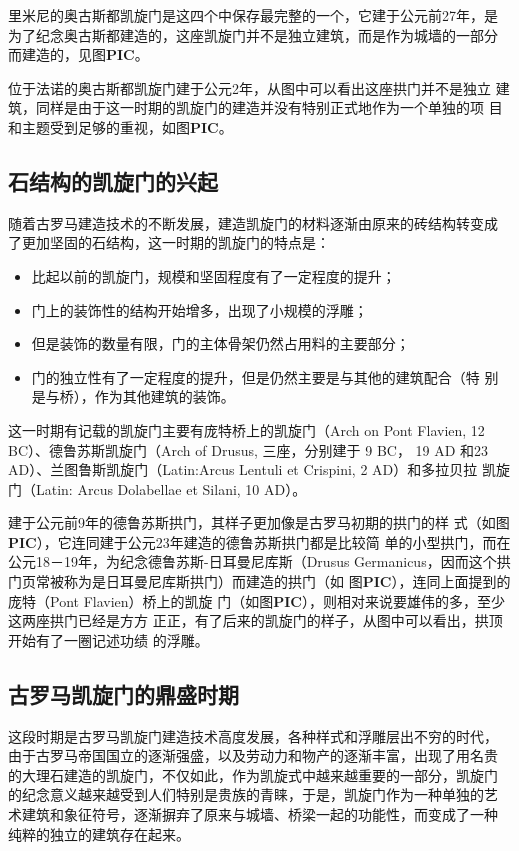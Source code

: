 \documentclass[a4paper,dvipdfm]{article}
\begin{document}
里米尼的奥古斯都凯旋门是这四个中保存最完整的一个，它建于公元前27年，是
为了纪念奥古斯都建造的，这座凯旋门并不是独立建筑，而是作为城墙的一部分
而建造的，见图\textbf{PIC}。

位于法诺的奥古斯都凯旋门建于公元2年，从图中可以看出这座拱门并不是独立
建筑，同样是由于这一时期的凯旋门的建造并没有特别正式地作为一个单独的项
目和主题受到足够的重视，如图\textbf{PIC}。


\subsection{石结构的凯旋门的兴起}

随着古罗马建造技术的不断发展，建造凯旋门的材料逐渐由原来的砖结构转变成
了更加坚固的石结构，这一时期的凯旋门的特点是：

\begin{itemize}
\item 比起以前的凯旋门，规模和坚固程度有了一定程度的提升；
\item 门上的装饰性的结构开始增多，出现了小规模的浮雕；
\item 但是装饰的数量有限，门的主体骨架仍然占用料的主要部分；
\item 门的独立性有了一定程度的提升，但是仍然主要是与其他的建筑配合（特
  别是与桥），作为其他建筑的装饰。
\end{itemize}

这一时期有记载的凯旋门主要有庞特桥上的凯旋门（Arch on Pont Flavien, 12
BC）、德鲁苏斯凯旋门（Arch of Drusus, 三座，分别建于 9 BC， 19 AD 和23
AD）、兰图鲁斯凯旋门（Latin:Arcus Lentuli et Crispini, 2 AD）和多拉贝拉
凯旋门（Latin: Arcus Dolabellae et Silani, 10 AD）。

建于公元前9年的德鲁苏斯拱门，其样子更加像是古罗马初期的拱门的样
式（如图\textbf{PIC}），它连同建于公元23年建造的德鲁苏斯拱门都是比较简
单的小型拱门，而在公元18－19年，为纪念德鲁苏斯-日耳曼尼库斯（Drusus
Germanicus，因而这个拱门页常被称为是日耳曼尼库斯拱门）而建造的拱门（如
图\textbf{PIC}），连同上面提到的庞特（Pont Flavien）桥上的凯旋
门（如图\textbf{PIC}），则相对来说要雄伟的多，至少这两座拱门已经是方方
正正，有了后来的凯旋门的样子，从图中可以看出，拱顶开始有了一圈记述功绩
的浮雕。

\subsection{古罗马凯旋门的鼎盛时期}

这段时期是古罗马凯旋门建造技术高度发展，各种样式和浮雕层出不穷的时代，
由于古罗马帝国国立的逐渐强盛，以及劳动力和物产的逐渐丰富，出现了用名贵
的大理石建造的凯旋门，不仅如此，作为凯旋式中越来越重要的一部分，凯旋门
的纪念意义越来越受到人们特别是贵族的青睐，于是，凯旋门作为一种单独的艺
术建筑和象征符号，逐渐摒弃了原来与城墙、桥梁一起的功能性，而变成了一种
纯粹的独立的建筑存在起来。
\end{document}
